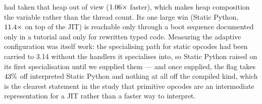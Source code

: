 had taken that heap out of view ($\meas{ratio:b6_gcscale-fork_cinderx:gc_collect/fork_cinderx/immortal_serial|b6_gcscale-fork_cinderx:gc_collect/fork_cinderx/immortal_par6}{1.06}\times$ faster), which makes heap composition the variable
rather than the thread count. Its one large win (Static Python, $\meas{ratio:b6_static-fork_static_adaptive:matmul96_int/fork_static_adaptive/boxed_jit|b6_static-fork_static_adaptive:matmul96_int/fork_static_adaptive/static_jit}{11.4}\times$ on top of the JIT) is reachable only through
a boot sequence documented only in a tutorial and only for rewritten typed code. Measuring the adaptive
configuration was itself work: the specialising path for static opcodes had been carried to 3.14
without the handlers it specialises into, so Static Python raised on its first specialisation
until we supplied them --- and once supplied, the flag takes $\meas{saving:b6_static-fork_static_adaptive:matmul96_int/fork_static_adaptive/static_interp|b6_static-fork_static:matmul96_int/fork_static/static_interp}{43}\%$ off interpreted Static
Python and nothing at all off the compiled kind, which is the clearest statement in the study
that primitive opcodes are an intermediate representation for a JIT rather than a faster way to
interpret.

